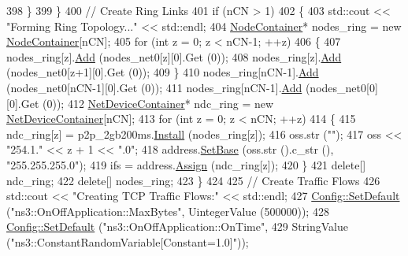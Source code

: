 \begin{DoxyCode}
398         \}
399     \}
400   \textcolor{comment}{// Create Ring Links}
401   \textcolor{keywordflow}{if} (nCN > 1) 
402     \{
403       std::cout << \textcolor{stringliteral}{"Forming Ring Topology..."} << std::endl;
404       \hyperlink{classns3_1_1NodeContainer}{NodeContainer}* nodes\_ring = \textcolor{keyword}{new} \hyperlink{classns3_1_1NodeContainer}{NodeContainer}[nCN];
405       \textcolor{keywordflow}{for} (\textcolor{keywordtype}{int} z = 0; z < nCN-1; ++z) 
406         \{
407           nodes\_ring[z].\hyperlink{classns3_1_1NodeContainer_aa60b3a0e70f2fb324e16ffcf8bf31fcb}{Add} (nodes\_net0[z][0].Get (0));
408           nodes\_ring[z].\hyperlink{classns3_1_1NodeContainer_aa60b3a0e70f2fb324e16ffcf8bf31fcb}{Add} (nodes\_net0[z+1][0].Get (0));
409         \}
410       nodes\_ring[nCN-1].\hyperlink{classns3_1_1NodeContainer_aa60b3a0e70f2fb324e16ffcf8bf31fcb}{Add} (nodes\_net0[nCN-1][0].Get (0));
411       nodes\_ring[nCN-1].\hyperlink{classns3_1_1NodeContainer_aa60b3a0e70f2fb324e16ffcf8bf31fcb}{Add} (nodes\_net0[0][0].Get (0));
412       \hyperlink{classns3_1_1NetDeviceContainer}{NetDeviceContainer}* ndc\_ring = \textcolor{keyword}{new} \hyperlink{classns3_1_1NetDeviceContainer}{NetDeviceContainer}[nCN];
413       \textcolor{keywordflow}{for} (\textcolor{keywordtype}{int} z = 0; z < nCN; ++z) 
414         \{
415           ndc\_ring[z] = p2p\_2gb200ms.\hyperlink{classns3_1_1PointToPointHelper_ab9162fea3e88722666fed1106df1f9ec}{Install} (nodes\_ring[z]);
416           oss.str (\textcolor{stringliteral}{""});
417           oss << \textcolor{stringliteral}{"254.1."} << z + 1 << \textcolor{stringliteral}{".0"};
418           address.\hyperlink{classns3_1_1Ipv4AddressHelper_acf7b16dd25bac67e00f5e25f90a9a035}{SetBase} (oss.str ().c\_str (), \textcolor{stringliteral}{"255.255.255.0"});
419           ifs = address.\hyperlink{classns3_1_1Ipv4AddressHelper_af8e7f4a1a7e74c00014a1eac445a27af}{Assign} (ndc\_ring[z]);
420         \}
421       \textcolor{keyword}{delete}[] ndc\_ring;
422       \textcolor{keyword}{delete}[] nodes\_ring;
423     \}
424 
425   \textcolor{comment}{// Create Traffic Flows}
426   std::cout << \textcolor{stringliteral}{"Creating TCP Traffic Flows:"} << std::endl;
427   \hyperlink{group__config_ga2e7882df849d8ba4aaad31c934c40c06}{Config::SetDefault} (\textcolor{stringliteral}{"ns3::OnOffApplication::MaxBytes"}, UintegerValue (500000));
428   \hyperlink{group__config_ga2e7882df849d8ba4aaad31c934c40c06}{Config::SetDefault} (\textcolor{stringliteral}{"ns3::OnOffApplication::OnTime"},
429                       StringValue (\textcolor{stringliteral}{"ns3::ConstantRandomVariable[Constant=1.0]"}));

\end{DoxyCode}

